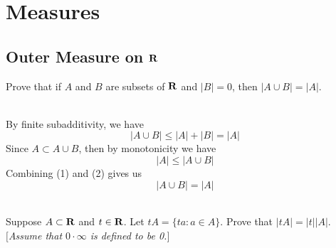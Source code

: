 \chapter{Measures}

\section{Outer Measure on $\mathbf{R}$}

\begin{exercise}
    Prove that if $A$ and $B$ are subsets of $\mathbf{R}$ and $|B| = 0$, then $|A \cup B| = |A|$. \\
\end{exercise}

\begin{solution}
    \\ By finite subadditivity, we have
    \[ |A \cup B| \leq |A| + |B| = |A| \tag*{(1)} \]
    Since $A \subset A \cup B$, then by monotonicity we have
    \[|A| \leq |A \cup B| \tag*{(2)}\]
    Combining (1) and (2) gives us
    $$|A \cup B| = |A|$$\\
\end{solution}

\begin{exercise}
    Suppose $A \subset \mathbf{R}$ and $t \in \mathbf{R}$. Let $tA = \{ta : a \in A\}$. Prove that $|tA| = |t||A|$.\\
    $[$\textit{Assume that $0\cdot \infty$ is defined to be 0.}$]$ \\
\end{exercise}

